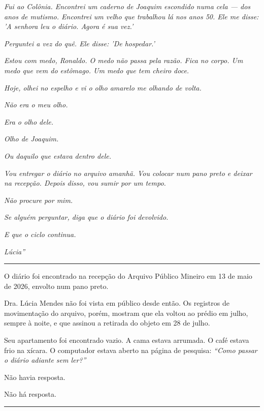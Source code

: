 \noindent \textit{Fui ao Colônia. Encontrei um caderno de Joaquim escondido numa cela --- dos anos de mutismo. Encontrei um velho que trabalhou lá nos anos 50. Ele me disse: 'A senhora leu o diário. Agora é sua vez.'}

\noindent \textit{Perguntei a vez do quê. Ele disse: 'De hospedar.'}

\noindent \textit{Estou com medo, Ronaldo. O medo não passa pela razão. Fica no corpo. Um medo que vem do estômago. Um medo que tem cheiro doce.}

\noindent \textit{Hoje, olhei no espelho e vi o olho amarelo me olhando de volta.}

\noindent \textit{Não era o meu olho.}

\noindent \textit{Era o olho dele.}

\noindent \textit{Olho de Joaquim.}

\noindent \textit{Ou daquilo que estava dentro dele.}

\noindent \textit{Vou entregar o diário no arquivo amanhã. Vou colocar num pano preto e deixar na recepção. Depois disso, vou sumir por um tempo.}

\noindent \textit{Não procure por mim.}

\noindent \textit{Se alguém perguntar, diga que o diário foi devolvido.}

\noindent \textit{E que o ciclo continua.}

\noindent \textit{Lúcia\textquotedblright{}}

\vspace{0.5em}\noindent\rule{\textwidth}{0.5pt}\vspace{0.5em}

\noindent O diário foi encontrado na recepção do Arquivo Público Mineiro em 13 de maio de 2026, envolto num pano preto.

\noindent Dra. Lúcia Mendes não foi vista em público desde então. Os registros de movimentação do arquivo, porém, mostram que ela voltou ao prédio em julho, sempre à noite, e que assinou a retirada do objeto em 28 de julho.

\noindent Seu apartamento foi encontrado vazio. A cama estava arrumada. O café estava frio na xícara. O computador estava aberto na página de pesquisa: \textit{\textquotedblleft{}Como passar o diário adiante sem ler?\textquotedblright{}}

\noindent Não havia resposta.

\noindent Não há resposta.

\vspace{0.5em}\noindent\rule{\textwidth}{0.5pt}\vspace{0.5em}

